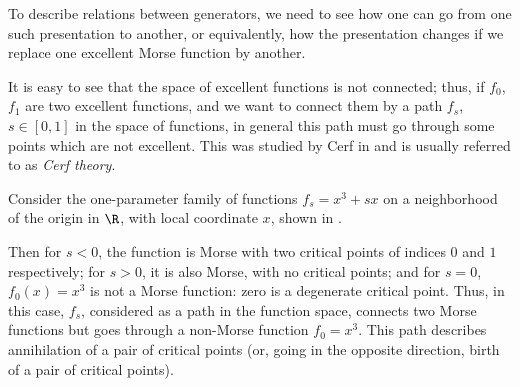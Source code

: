 To describe relations between generators, we need to see how one can go from
one such presentation to another, or equivalently, how the presentation changes
if we replace one excellent Morse function by another.

It is easy to see that the space of excellent functions is not connected; thus,
if $f_0$, $f_1$ are two excellent functions, and we want to connect them by a
path $f_s$, $s\in [0,1]$ in the space of functions, in general this path must go
through some points which are not excellent. This was studied by Cerf in
 and is usually referred to as \emph{Cerf theory}.

\begin{example}\label{x:morse-x3}
  Consider the one-parameter family of functions $f_s= x^3+sx$ on a neighborhood
  of the origin in $\R$, with local coordinate $x$, shown in .

  Then for $s<0$, the function is Morse with two critical points of indices
  $0$ and $1$ respectively; for $s>0$, it is also Morse, with no critical
  points; and for $s=0$, $f_0(x)=x^3$ is not a Morse function: zero is a
  degenerate critical point. Thus, in this case, $f_s$, considered as a path in
  the function space, connects two Morse functions but goes through a non-Morse
  function $f_0=x^3$. This path describes annihilation of a pair of critical
  points (or, going in the opposite direction, birth of a pair of critical
  points).


\end{example}
